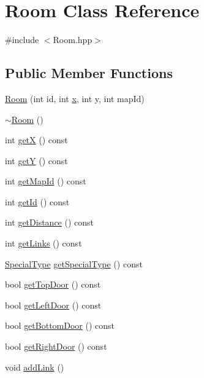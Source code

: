 \hypertarget{class_room}{\section{Room Class Reference}
\label{class_room}
}


{\ttfamily \#include $<$Room.\-hpp$>$}

\subsection*{Public Member Functions}
\begin{DoxyCompactItemize}
\item 
\hyperlink{class_room_aaef0b08fe3796290d4609470ddd9a0c4}{Room} (int id, int \hyperlink{jquery_8js_a4c3eadaa5164016d2c340d495fc6e55e}{x}, int y, int map\-Id)
\item 
\hyperlink{class_room_a67d5da09983cc53097807fd43ba5481a}{$\sim$\-Room} ()
\item 
int \hyperlink{class_room_a067f0dbf1e1981f3f53692c454032bad}{get\-X} () const 
\item 
int \hyperlink{class_room_a36707f281040aa8d27f13070b1a35b20}{get\-Y} () const 
\item 
int \hyperlink{class_room_ad36e96122696a31eec31a52ac99c4a4b}{get\-Map\-Id} () const 
\item 
int \hyperlink{class_room_a6f71af918166e1835662982219559d29}{get\-Id} () const 
\item 
int \hyperlink{class_room_a977bd80b8c374edb31eb467d191b7233}{get\-Distance} () const 
\item 
int \hyperlink{class_room_a63e8fe415cd7f3e7f327bf7603388638}{get\-Links} () const 
\item 
\hyperlink{_room_8hpp_a3879bd0aba9f20985139f480b9f73323}{Special\-Type} \hyperlink{class_room_a97488664cbabc4cef3a63d18526b5fc0}{get\-Special\-Type} () const 
\item 
bool \hyperlink{class_room_ad490b94e5406c002c875b4a507674008}{get\-Top\-Door} () const 
\item 
bool \hyperlink{class_room_a3b86ce135752e252c7f2900f29abbb6f}{get\-Left\-Door} () const 
\item 
bool \hyperlink{class_room_acb8b99c54a262c532a2b4f388fafc36a}{get\-Bottom\-Door} () const 
\item 
bool \hyperlink{class_room_a257c82e3ac31634b8612c33900fc28bc}{get\-Right\-Door} () const 
\item 
void \hyperlink{class_room_ab9ce2180afaa86a1881a245d1b539e03}{add\-Link} ()

\end{DoxyCompactItemize}
